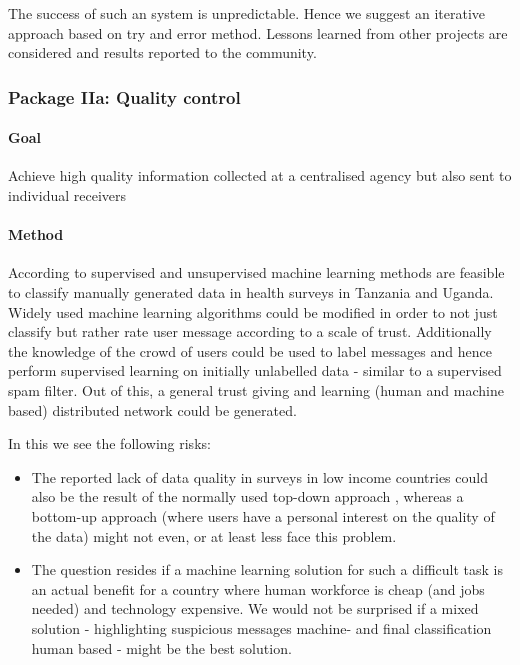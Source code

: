 \documentclass[11pt]{article}
\begin{document}
The success of such an system is unpredictable. Hence we suggest an iterative approach based on try and error method. Lessons learned from other projects are considered and results reported to the community.



\subsubsection*{Package IIa: Quality control}
\paragraph{Goal} Achieve high quality information collected at a centralised agency but also sent to individual receivers 
\paragraph{Method} According to \cite{birnbaum2012automated} supervised and unsupervised machine learning methods are feasible to classify manually generated data in health surveys in Tanzania and Uganda. Widely used machine learning algorithms could be modified in order to not just classify but rather rate user message according to a scale of trust. Additionally the knowledge of the crowd of users could be used to label messages and hence perform supervised learning on initially unlabelled data - similar to a supervised spam filter. Out of this, a general trust giving and learning (human and machine based) distributed network could be generated.

In this we see the following risks:

\begin{itemize}
 \item The reported lack of data quality in surveys in low income countries could also be the result of the normally used top-down approach \cite{birnbaum2012automated}, whereas a bottom-up approach  (where users have a personal interest on the quality of the data) might not even, or at least less face this problem.
 \item The question resides if a machine learning solution for such a difficult task is an actual benefit for a country where human workforce is cheap (and jobs needed) and technology expensive. We would not be surprised if a mixed solution - highlighting suspicious messages machine- and final classification human based - might be the best solution.
\end{itemize}
\end{document}

